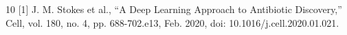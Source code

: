 \documentclass{report}
\begin{document}

\newpage
\tableofcontents


\begin{thebibliography}{10}
[1] J. M. Stokes et al., “A Deep Learning Approach to Antibiotic Discovery,” Cell, vol. 180, no. 4, pp. 688-702.e13, Feb. 2020, doi: 10.1016/j.cell.2020.01.021.
\end{thebibliography}
\end{document}
